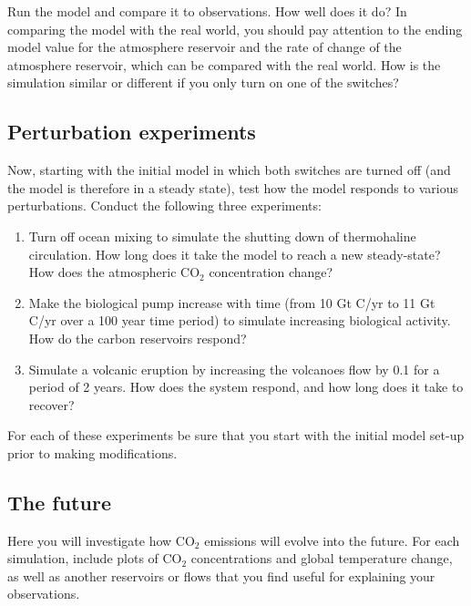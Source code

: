 \documentclass[11pt,letterpaper]{article}
\begin{document}
Run the model and compare it to observations. How well does it do? In comparing the model with the real world, you should pay attention to the ending model value for the atmosphere reservoir and the rate of change of the atmosphere reservoir, which can be compared with the real world. How is the simulation similar or different if you only turn on one of the switches?

\subsection{Perturbation experiments}
Now, starting with the initial model in which both switches are turned off (and the model is therefore in a steady state), test how the model responds to various perturbations. Conduct the following three experiments:
\begin{enumerate}
\item Turn off ocean mixing to simulate the shutting down of thermohaline circulation. How long does it take the model to reach a new steady-state? How does the atmospheric CO$_2$ concentration change?
\item Make the biological pump increase with time (from 10 Gt C/yr to 11 Gt C/yr over a 100 year time period) to simulate increasing biological activity.  How do the carbon reservoirs respond?
\item Simulate a volcanic eruption by increasing the volcanoes flow by 0.1 for a period of 2 years. How does the system respond, and how long does it take to recover?
\end{enumerate}
For each of these experiments be sure that you start with the initial model set-up prior to making modifications.

\subsection{The future}
Here you will investigate how CO$_2$ emissions will evolve into the future. For each simulation, include plots of CO$_2$ concentrations and global temperature change, as well as another reservoirs or flows that you find useful for explaining your observations.
\end{document}
